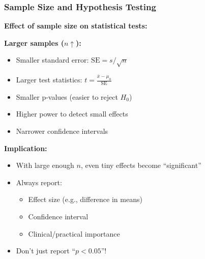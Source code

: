 \documentclass{beamer}
\begin{document}
\begin{frame}
\frametitle{Sample Size and Hypothesis Testing}
\textbf{Effect of sample size on statistical tests:}

\vspace{0.5cm}
\textbf{Larger samples ($n \uparrow$):}
\begin{itemize}
\item Smaller standard error: $\text{SE} = s/\sqrt{n}$
\item Larger test statistics: $t = \frac{\bar{x} - \mu_0}{\text{SE}}$
\item Smaller p-values (easier to reject $H_0$)
\item Higher power to detect small effects
\item Narrower confidence intervals
\end{itemize}

\vspace{0.5cm}
\textbf{Implication:}
\begin{itemize}
\item With large enough $n$, even tiny effects become ``significant''
\item Always report:
  \begin{itemize}
  \item Effect size (e.g., difference in means)
  \item Confidence interval
  \item Clinical/practical importance
  \end{itemize}
\item Don't just report ``$p < 0.05$''!
\end{itemize}
\end{frame}
\end{document}
